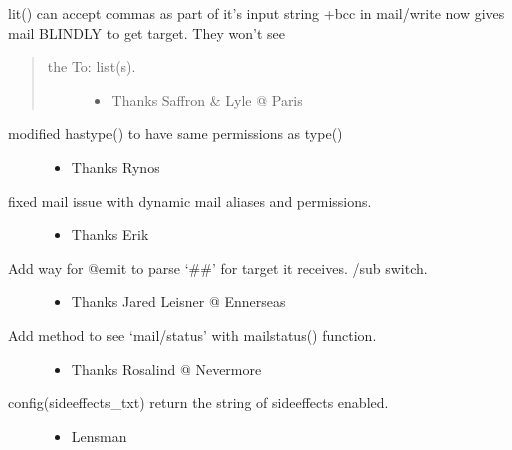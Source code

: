 \documentclass[letterpaper,10pt,english]{sphinxmanual}
\begin{document}
\sphinxAtStartPar
lit() can accept commas as part of it’s input string
+bcc in mail/write now gives mail BLINDLY to get target. They won’t see
\begin{quote}
\begin{description}
\item[{the To: list(s).}] \leavevmode\begin{itemize}
\item {} 
\sphinxAtStartPar
Thanks Saffron \& Lyle @ Paris

\end{itemize}

\end{description}
\end{quote}
\begin{description}
\item[{modified hastype() to have same permissions as type()}] \leavevmode\begin{itemize}
\item {} 
\sphinxAtStartPar
Thanks Rynos

\end{itemize}

\item[{fixed mail issue with dynamic mail aliases and permissions.}] \leavevmode\begin{itemize}
\item {} 
\sphinxAtStartPar
Thanks Erik

\end{itemize}

\item[{Add way for @emit to parse ‘\#\#’ for target it receives.  /sub switch.}] \leavevmode\begin{itemize}
\item {} 
\sphinxAtStartPar
Thanks Jared Leisner @ Ennerseas

\end{itemize}

\item[{Add method to see ‘mail/status’ with mailstatus() function.}] \leavevmode\begin{itemize}
\item {} 
\sphinxAtStartPar
Thanks Rosalind @ Nevermore

\end{itemize}

\item[{config(sideeffects\_txt) return the string of sideeffects enabled.}] \leavevmode\begin{itemize}
\item {} 
\sphinxAtStartPar
Lensman


\end{itemize}
\end{description}
\end{document}
